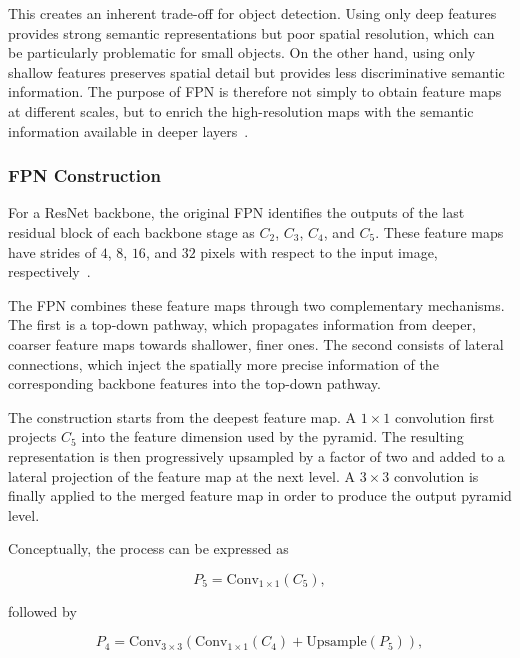 \documentclass[11pt,a4paper]{article}
\begin{document}
This creates an inherent trade-off for object detection. Using only deep
features provides strong semantic representations but poor spatial
resolution, which can be particularly problematic for small objects. On the
other hand, using only shallow features preserves spatial detail but provides
less discriminative semantic information. The purpose of FPN is therefore not
simply to obtain feature maps at different scales, but to enrich the
high-resolution maps with the semantic information available in deeper
layers~\cite{lin2017fpn}.

\subsubsection{FPN Construction}
\label{subsubsec:fpn_construction}

For a ResNet backbone, the original FPN identifies the outputs of the last
residual block of each backbone stage as $C_2$, $C_3$, $C_4$, and $C_5$.
These feature maps have strides of $4$, $8$, $16$, and $32$ pixels with
respect to the input image, respectively~\cite{lin2017fpn}.

The FPN combines these feature maps through two complementary mechanisms. The
first is a top-down pathway, which propagates information from deeper,
coarser feature maps towards shallower, finer ones. The second consists of
lateral connections, which inject the spatially more precise information of
the corresponding backbone features into the top-down pathway.

The construction starts from the deepest feature map. A $1\times1$
convolution first projects $C_5$ into the feature dimension used by the
pyramid. The resulting representation is then progressively upsampled by a
factor of two and added to a lateral projection of the feature map at the
next level. A $3\times3$ convolution is finally applied to the merged feature
map in order to produce the output pyramid level.

Conceptually, the process can be expressed as

\begin{equation}
P_5 =
\mathrm{Conv}_{1\times1}(C_5),
\end{equation}

followed by

\begin{equation}
P_4 =
\mathrm{Conv}_{3\times3}
\left(
\mathrm{Conv}_{1\times1}(C_4)
+
\mathrm{Upsample}(P_5)
\right),
\end{equation}
\end{document}
